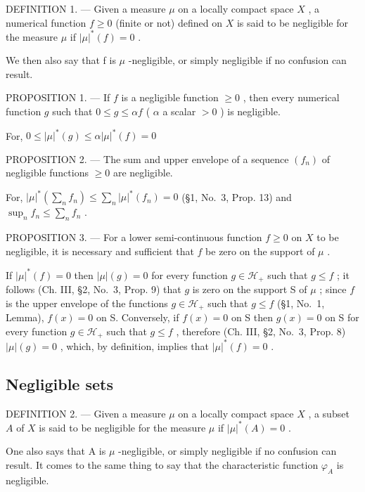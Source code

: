 DEFINITION 1. --- Given a measure \(\mu\) on a locally compact space \(X\) , a numerical function \(f \geqslant 0\) (finite or not) defined on \(X\) is said to be negligible for the measure \(\mu\) if \(|\mu|^*(f) = 0\) .

We then also say that f is \(\mu\) -negligible, or simply negligible if no confusion can result.

PROPOSITION 1. --- If \(f\) is a negligible function \(\geqslant 0\) , then every numerical function \(g\) such that \(0 \leqslant g \leqslant \alpha f\) ( \(\alpha\) a scalar \(> 0\) ) is negligible.

For, \(0 \leqslant |\mu|^*(g) \leqslant \alpha |\mu|^*(f) = 0\)

PROPOSITION 2. --- The sum and upper envelope of a sequence \((f_{n})\) of negligible functions \(\geqslant0\) are negligible.

For, \(|\mu|^*(\sum_n f_n) \leqslant \sum_n |\mu|^*(f_n) = 0\) (§1, No.~3, Prop. 13) and \(\sup_n f_n \leqslant \sum_n f_n\) .

PROPOSITION 3. --- For a lower semi-continuous function \(f \geqslant 0\) on \(X\) to be negligible, it is necessary and sufficient that \(f\) be zero on the support of \(\mu\) .

If \(|\mu|^*(f) = 0\) then \(|\mu|(g) = 0\) for every function \(g \in \mathcal{H}_+\) such that \(g \leqslant f\) ; it follows (Ch. III, §2, No.~3, Prop. 9) that \(g\) is zero on the support S of \(\mu\) ; since \(f\) is the upper envelope of the functions \(g \in \mathcal{H}_+\) such that \(g \leqslant f\) (§1, No.~1, Lemma), \(f(x) = 0\) on S. Conversely, if \(f(x) = 0\) on S then \(g(x) = 0\) on S for every function \(g \in \mathcal{H}_+\) such that \(g \leqslant f\) , therefore (Ch. III, §2, No.~3, Prop. 8) \(|\mu|(g) = 0\) , which, by definition, implies that \(|\mu|^*(f) = 0\) .

\subsection{Negligible sets}

DEFINITION 2. --- Given a measure \(\mu\) on a locally compact space \(X\) , a subset \(A\) of \(X\) is said to be negligible for the measure \(\mu\) if \(|\mu|^*(A) = 0\) .

One also says that A is \(\mu\) -negligible, or simply negligible if no confusion can result. It comes to the same thing to say that the characteristic function \(\varphi_{A}\) is negligible.


